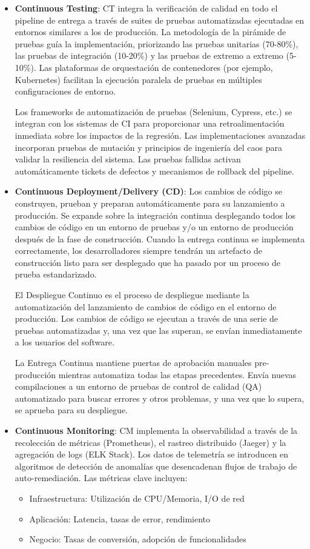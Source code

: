 \documentclass[12pt]{book}
\begin{document}
\begin{itemize}
    \item \textbf{Continuous Testing}:
    CT integra la verificación de calidad en todo el pipeline de entrega a través de suites de pruebas automatizadas ejecutadas en entornos similares a los de producción. La metodología de la pirámide de pruebas guía la implementación, priorizando las pruebas unitarias (70-80\%), las pruebas de integración (10-20\%) y las pruebas de extremo a extremo (5-10\%). Las plataformas de orquestación de contenedores (por ejemplo, Kubernetes) facilitan la ejecución paralela de pruebas en múltiples configuraciones de entorno.

    Los frameworks de automatización de pruebas (Selenium, Cypress, etc.) se integran con los sistemas de CI para proporcionar una retroalimentación inmediata sobre los impactos de la regresión. Las implementaciones avanzadas incorporan pruebas de mutación y principios de ingeniería del caos para validar la resiliencia del sistema. Las pruebas fallidas activan automáticamente tickets de defectos y mecanismos de rollback del pipeline.

    \item \textbf{Continuous Deployment/Delivery (CD)}:
    Los cambios de código se construyen, prueban y preparan automáticamente para su lanzamiento a producción. Se expande sobre la integración continua desplegando todos los cambios de código en un entorno de pruebas y/o un entorno de producción después de la fase de construcción. Cuando la entrega continua se implementa correctamente, los desarrolladores siempre tendrán un artefacto de construcción listo para ser desplegado que ha pasado por un proceso de prueba estandarizado.
    
    El Despliegue Continuo es el proceso de despliegue mediante la automatización del lanzamiento de cambios de código en el entorno de producción. Los cambios de código se ejecutan a través de una serie de pruebas automatizadas y, una vez que las superan, se envían inmediatamente a los usuarios del software.
    
    La Entrega Continua mantiene puertas de aprobación manuales pre-producción mientras automatiza todas las etapas precedentes. Envía nuevas compilaciones a un entorno de pruebas de control de calidad (QA) automatizado para buscar errores y otros problemas, y una vez que lo supera, se aprueba para su despliegue.
    \item \textbf{Continuous Monitoring}:
    CM implementa la observabilidad a través de la recolección de métricas (Prometheus), el rastreo distribuido (Jaeger) y la agregación de logs (ELK Stack). Los datos de telemetría se introducen en algoritmos de detección de anomalías que desencadenan flujos de trabajo de auto-remediación. Las métricas clave incluyen:
    \begin{itemize}
        \item Infraestructura: Utilización de CPU/Memoria, I/O de red
        \item Aplicación: Latencia, tasas de error, rendimiento
        \item Negocio: Tasas de conversión, adopción de funcionalidades
    \end{itemize}


\end{itemize}
\end{document}
